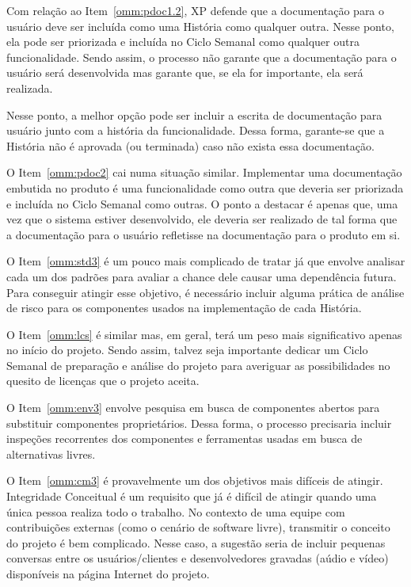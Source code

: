 Com relação ao Item~\ref{omm:pdoc1.2}, XP defende que a documentação
para o usuário deve ser incluída como uma História como qualquer
outra. Nesse ponto, ela pode ser priorizada e incluída no Ciclo
Semanal como qualquer outra funcionalidade. Sendo assim, o processo
não garante que a documentação para o usuário será desenvolvida mas
garante que, se ela for importante, ela será realizada.

Nesse ponto, a melhor opção pode ser incluir a escrita de documentação
para usuário junto com a história da funcionalidade. Dessa forma,
garante-se que a História não é aprovada (ou terminada) caso não
exista essa documentação.

O Item~\ref{omm:pdoc2} cai numa situação similar. Implementar uma
documentação embutida no produto é uma funcionalidade como outra que
deveria ser priorizada e incluída no Ciclo Semanal como outras. O
ponto a destacar é apenas que, uma vez que o sistema estiver
desenvolvido, ele deveria ser realizado de tal forma que a
documentação para o usuário refletisse na documentação para o produto
em si.

O Item~\ref{omm:std3} é um pouco mais complicado de tratar já que
envolve analisar cada um dos padrões para avaliar a chance dele causar
uma dependência futura. Para conseguir atingir esse objetivo, é
necessário incluir alguma prática de análise de risco para os
componentes usados na implementação de cada História.

O Item~\ref{omm:lcs} é similar mas, em geral, terá um peso mais
significativo apenas no início do projeto. Sendo assim, talvez seja
importante dedicar um Ciclo Semanal de preparação e análise do projeto
para averiguar as possibilidades no quesito de licenças que o projeto
aceita.

O Item~\ref{omm:env3} envolve pesquisa em busca de componentes abertos
para substituir componentes proprietários. Dessa forma, o processo
precisaria incluir inspeções recorrentes dos componentes e ferramentas
usadas em busca de alternativas livres.

O Item~\ref{omm:cm3} é provavelmente um dos objetivos mais difíceis de
atingir. Integridade Conceitual é um requisito que já é difícil de
atingir quando uma única pessoa realiza todo o trabalho. No contexto
de uma equipe com contribuições externas (como o cenário de software
livre), transmitir o conceito do projeto é bem complicado. Nesse caso,
a sugestão seria de incluir pequenas conversas entre os
usuários/clientes e desenvolvedores gravadas (aúdio e vídeo)
disponíveis na página Internet do projeto.


